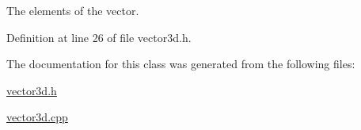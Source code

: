 \-The elements of the vector. 



\-Definition at line 26 of file vector3d.\-h.



\-The documentation for this class was generated from the following files\-:\begin{DoxyCompactItemize}
\item 
\hyperlink{vector3d_8h}{vector3d.\-h}\item 
\hyperlink{vector3d_8cpp}{vector3d.\-cpp}\end{DoxyCompactItemize}
